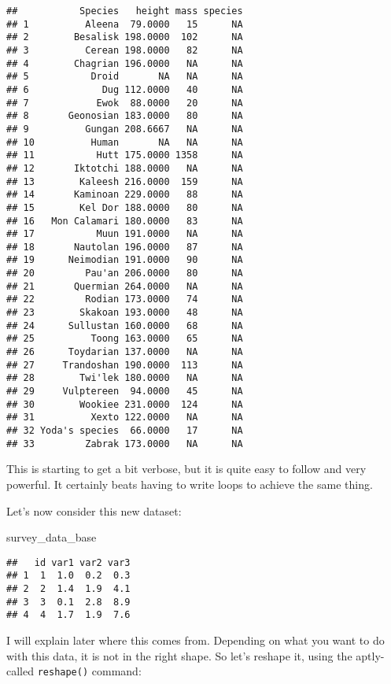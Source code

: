 \documentclass[
]{article}
\newenvironment{Shaded}{\begin{snugshade}}{\end{snugshade}}
\newcommand{\NormalTok}[1]{#1}
\begin{document}
\begin{verbatim}
##           Species   height mass species
## 1          Aleena  79.0000   15      NA
## 2        Besalisk 198.0000  102      NA
## 3          Cerean 198.0000   82      NA
## 4        Chagrian 196.0000   NA      NA
## 5           Droid       NA   NA      NA
## 6             Dug 112.0000   40      NA
## 7            Ewok  88.0000   20      NA
## 8       Geonosian 183.0000   80      NA
## 9          Gungan 208.6667   NA      NA
## 10          Human       NA   NA      NA
## 11           Hutt 175.0000 1358      NA
## 12       Iktotchi 188.0000   NA      NA
## 13        Kaleesh 216.0000  159      NA
## 14       Kaminoan 229.0000   88      NA
## 15        Kel Dor 188.0000   80      NA
## 16   Mon Calamari 180.0000   83      NA
## 17           Muun 191.0000   NA      NA
## 18       Nautolan 196.0000   87      NA
## 19      Neimodian 191.0000   90      NA
## 20         Pau'an 206.0000   80      NA
## 21       Quermian 264.0000   NA      NA
## 22         Rodian 173.0000   74      NA
## 23        Skakoan 193.0000   48      NA
## 24      Sullustan 160.0000   68      NA
## 25          Toong 163.0000   65      NA
## 26      Toydarian 137.0000   NA      NA
## 27     Trandoshan 190.0000  113      NA
## 28        Twi'lek 180.0000   NA      NA
## 29     Vulptereen  94.0000   45      NA
## 30        Wookiee 231.0000  124      NA
## 31          Xexto 122.0000   NA      NA
## 32 Yoda's species  66.0000   17      NA
## 33         Zabrak 173.0000   NA      NA
\end{verbatim}

This is starting to get a bit verbose, but it is quite easy to follow and very powerful. It certainly
beats having to write loops to achieve the same thing.

Let's now consider this new dataset:

\begin{Shaded}
\begin{Highlighting}[]
\NormalTok{survey\_data\_base}
\end{Highlighting}
\end{Shaded}

\begin{verbatim}
##   id var1 var2 var3
## 1  1  1.0  0.2  0.3
## 2  2  1.4  1.9  4.1
## 3  3  0.1  2.8  8.9
## 4  4  1.7  1.9  7.6
\end{verbatim}

I will explain later where this comes from. Depending on what you want to do with this data, it is
not in the right shape. So let's reshape it, using the aptly-called \texttt{reshape()} command:
\end{document}
